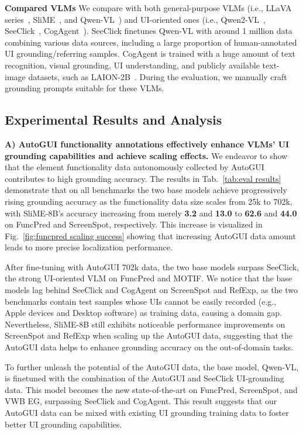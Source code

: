 \noindent\textbf{Compared VLMs}
We compare with both general-purpose VLMs (i.e., LLaVA series~\citep{liu2023llava,liu2024llavanext}, SliME~\citep{slime}, and Qwen-VL~\citep{bai2023qwen}) and UI-oriented ones (i.e., Qwen2-VL~\citep{qwen2vl}, SeeClick~\citep{cheng2024seeclick}, CogAgent~\citep{hong2023cogagent}). SeeClick finetunes Qwen-VL with around 1 million data combining various data sources, including a large proportion of human-annotated UI grounding/referring samples. CogAgent is trained with a huge amount of text recognition, visual grounding, UI understanding, and publicly available text-image datasets, such as LAION-2B~\citep{LAION5B}. During the evaluation, we manually craft grounding prompts suitable for these VLMs.
\subsection{Experimental Results and Analysis}


\noindent\textbf{A) AutoGUI functionality annotations effectively enhance VLMs' UI grounding capabilities and achieve scaling effects.} We endeavor to show that the element functionality data autonomously collected by AutoGUI contributes to high grounding accuracy. The results in Tab.~\ref{tab:eval results} demonstrate that on all benchmarks the two base models achieve progressively rising grounding accuracy as the functionality data size scales from 25k to 702k, with SliME-8B's accuracy increasing from merely \textbf{3.2} and \textbf{13.0} to \textbf{62.6} and \textbf{44.0} on FuncPred and ScreenSpot, respectively. This increase is visualized in Fig.~\ref{fig:funcpred scaling success} showing that increasing AutoGUI data amount leads to more precise localization performance.

After fine-tuning with AutoGUI 702k data, the two base models surpass SeeClick, the strong UI-oriented VLM on FuncPred and MOTIF. We notice that the base models lag behind SeeClick and CogAgent on ScreenSpot and RefExp, as the two benchmarks contain test samples whose UIs cannot be easily recorded (e.g., Apple devices and Desktop software) as training data, causing a domain gap. Nevertheless, SliME-8B still exhibits noticeable performance improvements on ScreenSpot and RefExp when scaling up the AutoGUI data, suggesting that the AutoGUI data helps to enhance grounding accuracy on the out-of-domain tasks.

To further unleash the potential of the AutoGUI data, the base model, Qwen-VL, is finetuned with the combination of the AutoGUI and SeeClick UI-grounding data. This model becomes the new state-of-the-art on FuncPred, ScreenSpot, and VWB EG, surpassing SeeClick and CogAgent. This result suggests that our AutoGUI data can be mixed with existing UI grounding training data to foster better UI grounding capabilities.

